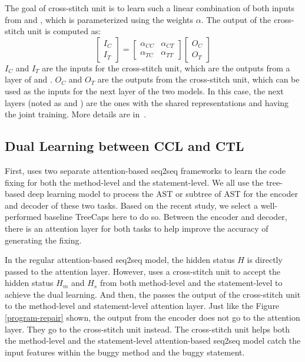 The goal of cross-stitch unit is to learn such a linear combination of
both inputs from  and , which is parameterized
using the weights $\alpha$. The output of the cross-stitch unit is
computed as:
\begin{equation}\label{eq:cross-stitch}
	\begin{bmatrix}
		I_C\\
		I_T
	\end{bmatrix}
	=
	\begin{bmatrix}
		\alpha_{CC} &  \alpha_{CT} \\
		\alpha_{TC} &  \alpha_{TT}
	\end{bmatrix}
	\begin{bmatrix}
		O_C\\
		O_T
	\end{bmatrix}
\end{equation}
$I_C$ and $I_T$ are the inputs for the cross-stitch unit, which are
the outputs from a layer of  and . $O_C$ and $O_T$
are the outputs from the cross-stitch unit, which can be used as the
inputs for the next layer of the two models. In this case, the next
layers (noted as  and ) are the ones with the
shared representations and having the joint training. More details are
in~\cite{misra2016cross}.

\subsection{Dual Learning between CCL and CTL}

First, \tool uses two separate attention-based seq2seq frameworks to learn the code fixing for both the method-level and the statement-level. We all use the tree-based deep learning model to process the AST or subtree of AST for the encoder and decoder of these two tasks. Based on the recent study, we select a well-performed baseline TreeCaps \cite{bui2021treecaps} here to do so. Between the encoder and decoder, there is an attention layer for both tasks to help improve the accuracy of generating the fixing.

In the regular attention-based seq2seq model, the hidden status $H$ is directly passed to the attention layer. However, \tool uses a cross-stitch unit to accept the hidden status $H_m$ and $H_s$ from both method-level and the statement-level to achieve the dual learning. And then, the \tool passes the output of the cross-stitch unit to the method-level and statement-level attention layer. Just like the Figure \ref{program-repair} shown, the output from the encoder does not go to the attention layer. They go to the cross-stitch unit instead. The cross-stitch unit helps both the method-level and the statement-level attention-based seq2seq model catch the input features within the buggy method and the buggy statement.

